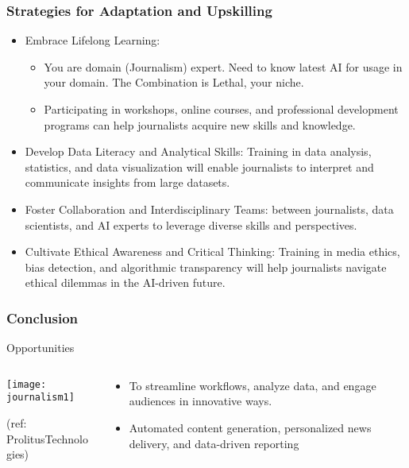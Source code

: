 \begin{frame}[fragile]\frametitle{Strategies for Adaptation and Upskilling}

\begin{itemize}
\item Embrace Lifelong Learning: 
    \begin{itemize}
        \item You are domain (Journalism) expert. Need to know latest AI for usage in your domain. The Combination is Lethal, your niche.
        \item Participating in workshops, online courses, and professional development programs can help journalists acquire new skills and knowledge.
    \end{itemize}
\item Develop Data Literacy and Analytical Skills: Training in data analysis, statistics, and data visualization will enable journalists to interpret and communicate insights from large datasets.
\item Foster Collaboration and Interdisciplinary Teams: between journalists, data scientists, and AI experts to leverage diverse skills and perspectives.
\item Cultivate Ethical Awareness and Critical Thinking: Training in media ethics, bias detection, and algorithmic transparency will help journalists navigate ethical dilemmas in the AI-driven future.
\end{itemize}

\end{frame}

\begin{frame}[fragile]\frametitle{Conclusion}

Opportunities

\begin{columns}
    \begin{column}[T]{0.6\linewidth}
		\begin{center}
		\texttt{[image: journalism1]}
		
		{\tiny (ref: ProlitusTechnologies)}
		\end{center}

    \end{column}
    \begin{column}[T]{0.4\linewidth}

			\begin{itemize}
				\item To streamline workflows, analyze data, and engage audiences in innovative ways.
				\item Automated content generation, personalized news delivery, and data-driven reporting 
			\end{itemize}
    \end{column}
  \end{columns}
\end{frame}



